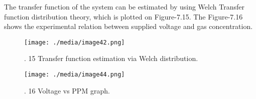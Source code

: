 \begin{enumerate}

\par

\par

\begin{justify}
The transfer function of the system can be estimated by using Welch Transfer function distribution theory, which is plotted on Figure-7.15. The Figure-7.16 shows the experimental relation between supplied voltage and gas concentration.
\end{justify}\par




\begin{figure}[H]
	\begin{Center}
		\texttt{[image: ./media/image42.png]}
		\caption{. 15 Transfer function estimation via Welch distribution.}
		\label{fig:_15_Transfer_function_estimation_via_Welch_distribution}
	\end{Center}
\end{figure}



\par

\par


\vspace{\baselineskip}



\begin{figure}[H]
	\begin{Center}
		\texttt{[image: ./media/image44.png]}
		\caption{. 16 Voltage vs PPM graph.}
		\label{fig:_16_Voltage_vs_PPM_graph}
	\end{Center}
\end{figure}



\par

\par


\end{enumerate}
